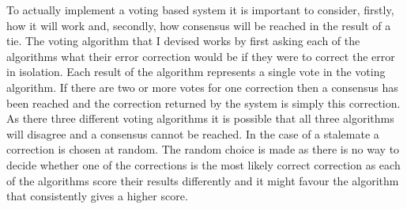 To actually implement a voting based system it is important to consider, firstly, how it will work and, secondly, how consensus will be reached in the result of a tie. The voting algorithm that I devised works by first asking each of the algorithms what their error correction would be if they were to correct the error in isolation. Each result of the algorithm represents a single vote in the voting algorithm. If there are two or more votes for one correction then a consensus has been reached and the correction returned by the system is simply this correction. As there three different voting algorithms it is possible that all three algorithms will disagree and a consensus cannot be reached. In the case of a stalemate a correction is chosen at random. The random choice is made as there is no way to decide whether one of the corrections is the most likely correct correction as each of the algorithms score their results differently and it might favour the algorithm that consistently gives a higher score.
